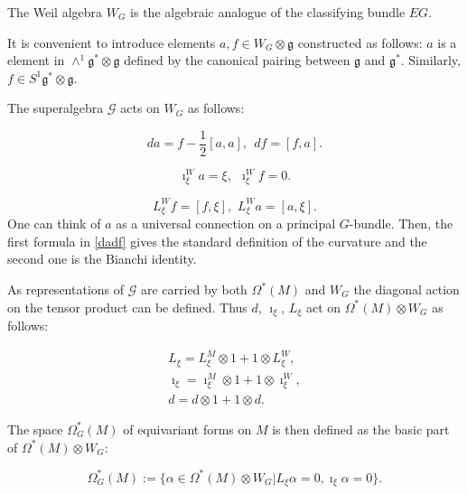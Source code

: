 \documentclass[11pt]{report}
\theoremstyle{plain}
\theoremstyle{definition}
\theoremstyle{remark}
\theoremstyle{remark}
\numberwithin{equation}{section}
\begin{document}
The Weil algebra $W_G$ is the algebraic analogue of the classifying bundle $EG$. 

It is convenient to introduce elements $a, f \in W_G \otimes \mathfrak{g}$ constructed as follows: $a$ is a element in $\wedge^1 \mathfrak{g}^* \otimes \mathfrak{g}$ defined by the canonical pairing between $\mathfrak{g}$ and $\mathfrak{g}^*$. Similarly, $f \in S^1\mathfrak{g}^* \otimes \mathfrak{g}$.

The superalgebra $\mathcal{G}$ acts on $W_G$ as follows:

%
\begin{equation} \label{dadf}
da = f - \frac{1}{2}[a, a], \  \ df = [f, a].
\end{equation}

\begin{equation}
\imath_\xi^W a = \xi, \  \  \imath_\xi^W f = 0.
\end{equation}

\begin{equation}
L_{\xi}^W f = [f, \xi], \,   \,   L_{\xi}^W a = [a, \xi].
\end{equation}
One can think of $a$ as a universal connection on a principal $G$-bundle. Then,  the first formula in \eqref{dadf} gives the standard definition of the curvature and the second one is the Bianchi identity. 

As representations of $\mathcal{G}$ are carried by both $\Omega^*(M)$ and $W_G$ the diagonal action on the tensor product can be defined.
Thus $d$, $\imath_\xi$, $L_\xi$ act on $\Omega^*(M) \otimes W_G$ as follows:

%
\begin{equation}
\begin{split}
L_{\xi} = L_{\xi}^M \otimes 1 + 1 \otimes L_{\xi}^W, \\
\imath_{\xi} = \imath_{\xi}^M \otimes 1 + 1 \otimes \imath_{\xi}^W, \\
d = d \otimes 1 + 1 \otimes d.
\end{split}
\end{equation}

The space $\Omega^*_G (M)$ of equivariant forms on $M$  is then defined as the basic part of $\Omega^*(M) \otimes W_G$:

%
$$ \Omega^*_G (M) :=\{ \alpha \in \Omega^*(M) \otimes W_G | L_{\xi} \alpha = 0, \imath_\xi \alpha = 0 \}. $$
\end{document}
